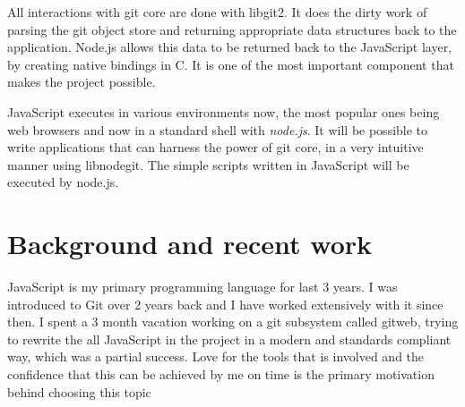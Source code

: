 All interactions with git core are done with libgit2. It does the dirty work of
parsing the git object store and returning appropriate data structures back to
the application. Node.js allows this data to be returned back to the JavaScript
layer, by creating native bindings in C. It is one of the most important
component that makes the project possible.

JavaScript executes in various environments now, the most popular ones being web
browsers and now in a standard shell with \textit{node.js}. It will be possible
to write applications that can harness the power of git core, in a very
intuitive manner using libnodegit. The simple scripts written in JavaScript will
be executed by node.js.

\section{Background and recent work}

JavaScript is my primary programming language for last 3 years. I was introduced
to Git over 2 years back and I have worked extensively with it since then. I
spent a 3 month vacation working on a git subsystem called gitweb, trying to
rewrite the all JavaScript in the project in a modern and standards compliant
way, which was a partial success. Love for the tools that is involved and the
confidence that this can be achieved by me on time is the primary motivation
behind choosing this topic
